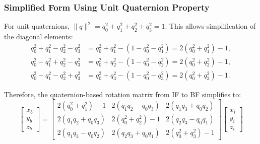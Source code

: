 \subsubsection*{Simplified Form Using Unit Quaternion Property}

For unit quaternions, $\|q\|^2 = q_0^2 + q_1^2 + q_2^2 + q_3^2 = 1$. This allows simplification of the diagonal elements:
\begin{align}
q_0^2 + q_1^2 - q_2^2 - q_3^2 &= q_0^2 + q_1^2 - (1 - q_0^2 - q_1^2) = 2(q_0^2 + q_1^2) - 1, \\
q_0^2 - q_1^2 + q_2^2 - q_3^2 &= q_0^2 + q_2^2 - (1 - q_0^2 - q_2^2) = 2(q_0^2 + q_2^2) - 1, \\
q_0^2 - q_1^2 - q_2^2 + q_3^2 &= q_0^2 + q_3^2 - (1 - q_0^2 - q_3^2) = 2(q_0^2 + q_3^2) - 1.
\end{align}

Therefore, the quaternion-based rotation matrix from IF to BF simplifies to:
\begin{equation}
\begin{bmatrix}
x_b \\ y_b \\ z_b
\end{bmatrix}
=
\begin{bmatrix}
2(q_0^2 + q_1^2) - 1 & 2(q_1 q_2 - q_0 q_3) & 2(q_1 q_3 + q_0 q_2) \\
2(q_1 q_2 + q_0 q_3) & 2(q_0^2 + q_2^2) - 1 & 2(q_2 q_3 - q_0 q_1) \\
2(q_1 q_3 - q_0 q_2) & 2(q_2 q_3 + q_0 q_1) & 2(q_0^2 + q_3^2) - 1
\end{bmatrix}
\begin{bmatrix}
x_i \\ y_i \\ z_i
\end{bmatrix}
\label{eqn:rotation_matrix_simplified}
\end{equation}




